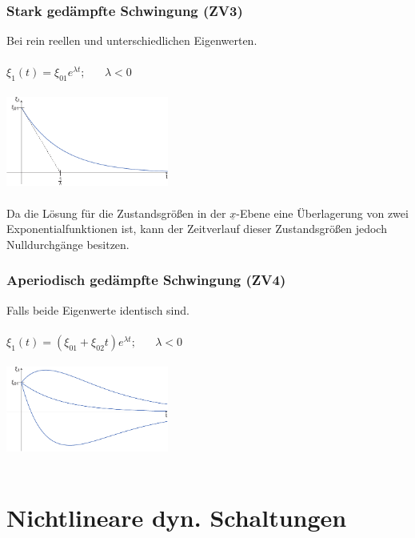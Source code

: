\documentclass[a4paper,twocolumn,10pt]{article}
\begin{document}
\subsubsection*{Stark gedämpfte Schwingung (ZV3)}
Bei rein reellen und unterschiedlichen Eigenwerten.\\\\
$\xi_1(t)=\xi_{01}e^{\lambda t};\;\;\;\;\;\;\lambda<0$\\\\
\includegraphics[width=0.4\textwidth]{Grafiken/Zustandsvariablen_Zeitverlauf3}\\\\
Da die Lösung für die Zustandsgrößen in der $\underline{x}$-Ebene eine Überlagerung von zwei Exponentialfunktionen ist, kann der Zeitverlauf dieser Zustandsgrößen jedoch Nulldurchgänge besitzen.

\subsubsection*{Aperiodisch gedämpfte Schwingung (ZV4)}
Falls beide Eigenwerte identisch sind.\\\\
$\xi_1(t)=(\xi_{01}+\xi_{02}t)e^{\lambda t};\;\;\;\;\;\;\lambda<0$\\\\
\includegraphics[width=0.4\textwidth]{Grafiken/Zustandsvariablen_Zeitverlauf4}\\\\

\section*{Nichtlineare dyn. Schaltungen}
\end{document}
